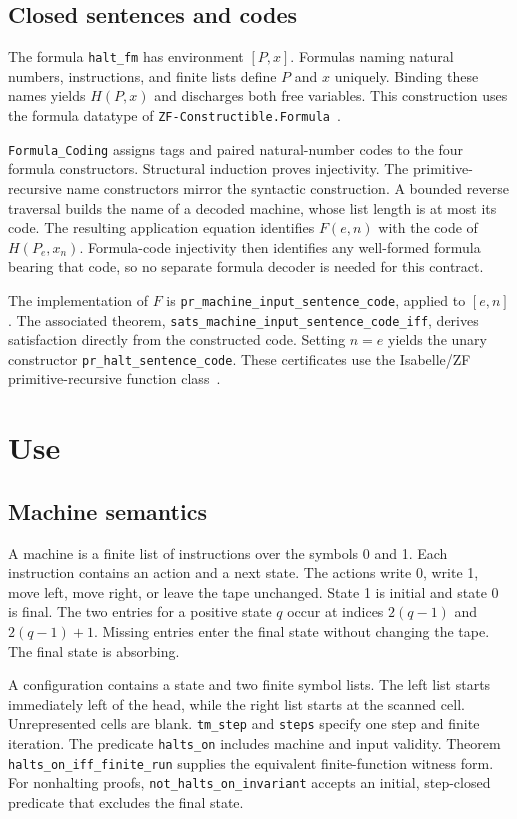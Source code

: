 \documentclass[11pt,a4paper]{article}
\newcommand{\theoremname}[1]{{\urlstyle{tt}\nolinkurl{#1}}}
\begin{document}
\subsection{Closed sentences and codes}
The formula \theoremname{halt_fm} has environment $[P,x]$.
Formulas naming natural numbers, instructions, and finite lists define
$P$ and $x$ uniquely. Binding these names yields $H(P,x)$ and discharges
both free variables. This construction uses the formula datatype of
\texttt{ZF-Constructible.Formula}~\cite{paulson-zf}.

\theoremname{Formula_Coding} assigns tags and paired natural-number
codes to the four formula constructors. Structural induction proves
injectivity. The primitive-recursive name constructors mirror the
syntactic construction. A bounded reverse traversal builds the name of
a decoded machine, whose list length is at most its code.
The resulting application equation identifies $F(e,n)$ with the code
of $H(P_e,x_n)$. Formula-code injectivity then identifies any well-formed
formula bearing that code, so no separate formula decoder is needed
for this contract.

The implementation of $F$ is
\theoremname{pr_machine_input_sentence_code}, applied to $[e,n]$.
The associated theorem,
\theoremname{sats_machine_input_sentence_code_iff}, derives satisfaction
directly from the constructed code. Setting $n=e$ yields the unary
constructor \theoremname{pr_halt_sentence_code}.
These certificates use the Isabelle/ZF primitive-recursive function
class~\cite{szasz}.

\section{Use}
\subsection{Machine semantics}
A machine is a finite list of instructions over the symbols 0 and 1.
Each instruction contains an action and a next state. The actions write
0, write 1, move left, move right, or leave the tape unchanged. State 1
is initial and state 0 is final. The two entries for a positive state $q$
occur at indices $2(q-1)$ and $2(q-1)+1$. Missing entries enter the final
state without changing the tape. The final state is absorbing.

A configuration contains a state and two finite symbol lists. The left
list starts immediately left of the head, while the right list starts
at the scanned cell. Unrepresented cells are blank.
\theoremname{tm_step} and \theoremname{steps} specify one step and finite
iteration. The predicate \theoremname{halts_on} includes machine and
input validity. Theorem \theoremname{halts_on_iff_finite_run} supplies
the equivalent finite-function witness form.
For nonhalting proofs, \theoremname{not_halts_on_invariant} accepts an
initial, step-closed predicate that excludes the final state.
\end{document}
